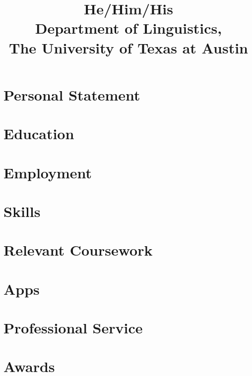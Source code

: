 \documentclass[letterpaper]{practical-resume}
\title{He/Him/His\\Department of Linguistics,\\The University of Texas at Austin}
\begin{document}
\makecvtitle

\section{Personal Statement}


\section{Education}


\section{Employment}


\printbibliography[title=Select Publications]

\section{Skills}


\section{Relevant Coursework}


\section{Apps}


\section{Professional Service}


\section{Awards}

\end{document}
